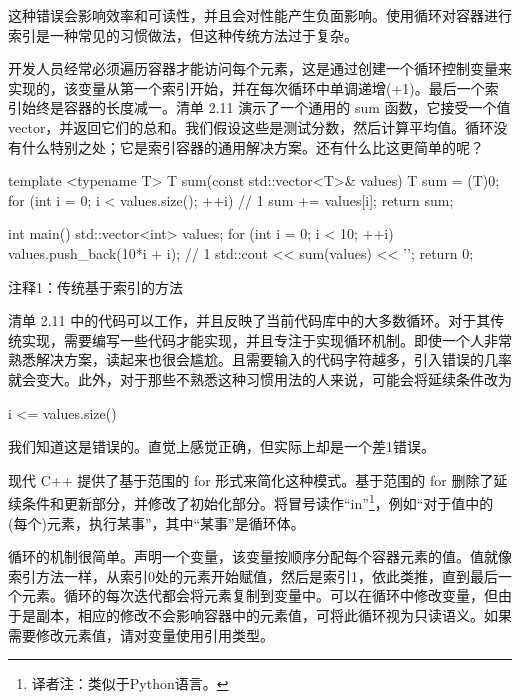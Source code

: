 这种错误会影响效率和可读性，并且会对性能产生负面影响。使用循环对容器进行索引是一种常见的习惯做法，但这种传统方法过于复杂。


开发人员经常必须遍历容器才能访问每个元素，这是通过创建一个循环控制变量来实现的，该变量从第一个索引开始，并在每次循环中单调递增(+1)。最后一个索引始终是容器的长度减一。清单 2.11 演示了一个通用的 sum 函数，它接受一个值vector，并返回它们的总和。我们假设这些是测试分数，然后计算平均值。循环没有什么特别之处；它是索引容器的通用解决方案。还有什么比这更简单的呢？


\begin{cpp}
template <typename T>
T sum(const std::vector<T>& values) {
  T sum = (T)0;
  for (int i = 0; i < values.size(); ++i) // 1
    sum += values[i];
  return sum;
}

int main() {
  std::vector<int> values;
  for (int i = 0; i < 10; ++i)
    values.push_back(10*i + i); // 1
  std::cout << sum(values) << '\n';
  return 0;
}
\end{cpp}

{\footnotesize
注释1：传统基于索引的方法
}


清单 2.11 中的代码可以工作，并且反映了当前代码库中的大多数循环。对于其传统实现，需要编写一些代码才能实现，并且专注于实现循环机制。即使一个人非常熟悉解决方案，读起来也很会尴尬。且需要输入的代码字符越多，引入错误的几率就会变大。此外，对于那些不熟悉这种习惯用法的人来说，可能会将延续条件改为

\begin{cpp}
i <= values.size()
\end{cpp}

我们知道这是错误的。直觉上感觉正确，但实际上却是一个差1错误。


现代 C++ 提供了基于范围的 for 形式来简化这种模式。基于范围的 for 删除了延续条件和更新部分，并修改了初始化部分。将冒号读作“in”\footnote{译者注：类似于Python语言。}，例如“对于值中的(每个)元素，执行某事”，其中“某事”是循环体。

循环的机制很简单。声明一个变量，该变量按顺序分配每个容器元素的值。值就像索引方法一样，从索引0处的元素开始赋值，然后是索引1，依此类推，直到最后一个元素。循环的每次迭代都会将元素复制到变量中。可以在循环中修改变量，但由于是副本，相应的修改不会影响容器中的元素值，可将此循环视为只读语义。如果需要修改元素值，请对变量使用引用类型。

